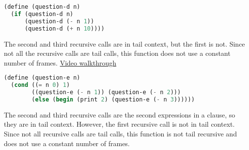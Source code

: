 \begin{minipage}{\linewidth}
\begin{lstlisting}[language=Scheme]
(define (question-d n)
  (if (question-d n)
      (question-d (- n 1))
      (question-d (+ n 10))))
\end{lstlisting}
\end{minipage}
\begin{solution}[0in]
The second and third recursive calls are in tail context, but the first is not.
Since not all the recursive calls are tail calls, this function does not use a
constant number of frames.
\href{https://youtu.be/QbtKMreFRl8?t=9m}{Video walkthrough}
\end{solution}

\begin{minipage}{\linewidth}
\begin{lstlisting}[language=Scheme]
(define (question-e n)
  (cond ((= n 0) 1)
        ((question-e (- n 1)) (question-e (- n 2)))
        (else (begin (print 2) (question-e (- n 3))))))
\end{lstlisting}
\end{minipage}
\begin{solution}[0in]
The second and third recursive calls are the second expressions in a clause, so
they are in tail context. However, the first recursive call is not in tail
context. Since not all recursive calls are tail calls, this function is not
tail recursive and does not use a constant number of frames.
\end{solution}
